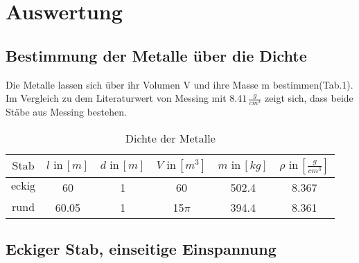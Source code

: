 \newpage
\section{Auswertung}
\label{sec:Auswertung}



\subsection{Bestimmung der Metalle über die Dichte}
Die Metalle lassen sich über ihr Volumen V und ihre Masse m bestimmen(Tab.1).
Im Vergleich zu dem Literaturwert von Messing mit $8.41\, \frac{g}{cm^3}$\cite{litval}
zeigt sich, dass beide Stäbe aus Messing bestehen.
\begin{table}[h]
  \centering
  \label{tab:2}
  \begin{tabular}{ c c c c c c }
    \toprule
    {$\text{Stab}$}
   &{$l \,\, \text{in} \, [m]$}
   &{$d \,\, \text{in} \, [m]$}
   &{$V \,\, \text{in} \, [m^3]$}
   &{$m \,\, \text{in} \, [kg]$}
   &{$\rho \,\, \text{in} \, [\frac{g}{cm^3}]$} \\
    \midrule
     {$\text{eckig}$}&60&1&60&502.4 & 8.367 \\
     {$\text{rund}$}&60.05&1&15$\pi$&394.4 & 8.361 \\
    \bottomrule
  \end{tabular}
  \caption{Dichte der Metalle}
\end{table}


\subsection{Eckiger Stab, einseitige Einspannung}

